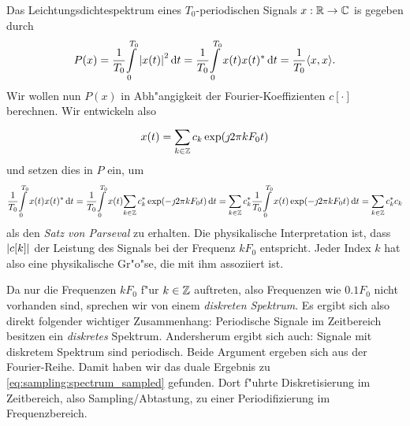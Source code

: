 Das Leichtungsdichtespektrum eines $T_0$-periodischen Signals $x: \mathbb{R} \rightarrow \mathbb{C}$ is gegeben durch
\begin{equation}\label{eq:fourier:period_psd}
P(x) = \frac{1}{T_0}{\int\limits_{0}^{T_0}{{\left| x(t) \right|}^2}\,\mathrm{d}{t}}
     = \frac{1}{T_0}{\int\limits_{0}^{T_0}{x(t) x(t)^\ast}\,\mathrm{d}{t}}
     = \frac{1}{T_0} {\left\langle x,x \right\rangle}.
\end{equation}
Wir wollen nun $P(x)$ in Abh"angigkeit der Fourier-Koeffizienten $c[\cdot]$ berechnen.
Wir entwickeln also
\[
x(t) = {\sum\limits_{k \in \mathbb{Z}}^{}{
    c_k \exp(\jmath 2 \pi k F_0 t)
}}
\]
und setzen dies in $P$ ein, um
%
\begin{equation}\label{eq:fourier:series_parseval}
    \frac{1}{T_0}{\int\limits_{0}^{T_0}{x(t) x(t)^\ast}\,\mathrm{d}{t}}
        = \frac{1}{T_0}{\int\limits_{0}^{T_0}{
            x(t) 
            {\sum\limits_{k \in \mathbb{Z}}^{}{
                c_k^\ast \exp(-\jmath 2 \pi k F_0 t)
            }}
        }\,\mathrm{d}{t}}
        = {\sum\limits_{k \in \mathbb{Z}}^{}{
            c_k^\ast 
            \frac{1}{T_0}{\int\limits_{0}^{T_0}{
                x(t)
                \exp(-\jmath 2 \pi k F_0 t)
            }\,\mathrm{d}{t}}
        }}
        = {\sum\limits_{k \in \mathbb{Z}}^{}{
            c_k^\ast c_k
        }}
\end{equation}
%
als den \emph{Satz von Parseval} zu erhalten.
Die physikalische Interpretation ist, dass ${\left| c[k] \right|}$ der Leistung des Signals bei der Frequenz $k F_0$ entspricht.
Jeder Index $k$ hat also eine physikalische Gr"o"se, die mit ihm assoziiert ist.

Da nur die Frequenzen $k F_0$ f"ur $k \in \mathbb{Z}$ auftreten, also Frequenzen wie $0.1 F_0$ nicht vorhanden sind, sprechen wir von einem \emph{diskreten Spektrum}.
Es ergibt sich also direkt folgender wichtiger Zusammenhang: Periodische Signale im Zeitbereich besitzen ein \emph{diskretes} Spektrum.
Andersherum ergibt sich auch: Signale mit diskretem Spektrum sind periodisch.
Beide Argument ergeben sich aus der Fourier-Reihe.
Damit haben wir das duale Ergebnis zu \eqref{eq:sampling:spectrum_sampled} gefunden.
Dort f"uhrte Diskretisierung im Zeitbereich, also Sampling/Abtastung, zu einer Periodifizierung im Frequenzbereich.

